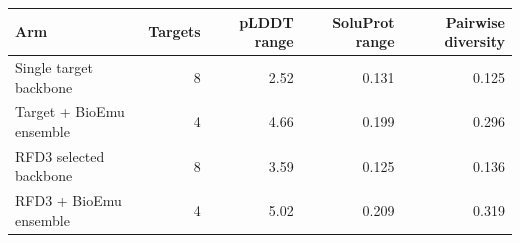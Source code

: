 \begin{tabular}{lrrrr}
\toprule
Arm & Targets & pLDDT range & SoluProt range & Pairwise diversity \\
\midrule
Single target backbone & 8 & 2.52 & 0.131 & 0.125 \\
Target + BioEmu ensemble & 4 & 4.66 & 0.199 & 0.296 \\
RFD3 selected backbone & 8 & 3.59 & 0.125 & 0.136 \\
RFD3 + BioEmu ensemble & 4 & 5.02 & 0.209 & 0.319 \\
\bottomrule
\end{tabular}
